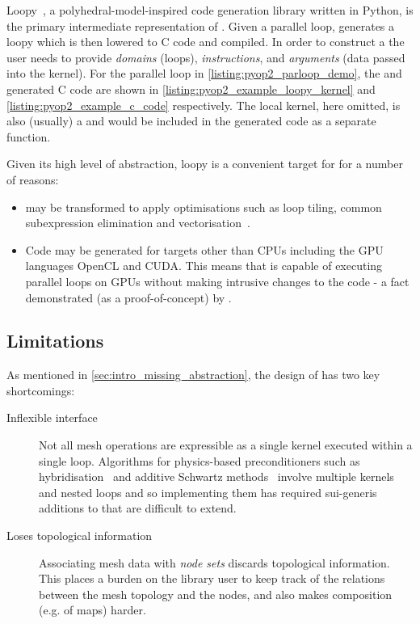 \documentclass[thesis]{subfiles}
\begin{document}
Loopy~\cite{klocknerLooPyTransformationbased2014}, a polyhedral-model-inspired code generation library written in Python, is the primary intermediate representation of .
Given a parallel loop,  generates a loopy  which is then lowered to C code and compiled.
In order to construct a  the user needs to provide \emph{domains} (loops), \emph{instructions}, and \emph{arguments} (data passed into the kernel).
For the parallel loop in \cref{listing:pyop2_parloop_demo}, the  and generated C code are shown in \cref{listing:pyop2_example_loopy_kernel} and \cref{listing:pyop2_example_c_code} respectively.
The local kernel, here omitted, is also (usually) a  and would be included in the generated code as a separate function.

Given its high level of abstraction, loopy is a convenient target for  for a number of reasons:

\begin{itemize}
  \item
     may be transformed to apply optimisations such as loop tiling, common subexpression elimination and vectorisation~\cite{sunStudyVectorizationMatrixfree2020}.
  \item
    Code may be generated for targets other than CPUs including the GPU languages OpenCL and CUDA.
    This means that  is capable of executing parallel loops on GPUs without making intrusive changes to the code - a fact demonstrated (as a proof-of-concept) by \cite{fenics2021-kulkarni}.
\end{itemize}

\subsection{Limitations}
\label{sec:pyop2_limitations}

As mentioned in \cref{sec:intro_missing_abstraction}, the design of  has two key shortcomings:

\begin{description}
  \item[Inflexible interface]
    Not all mesh operations are expressible as a single kernel executed within a single loop.
    Algorithms for physics-based preconditioners such as hybridisation~\cite{gibsonSlateExtendingFiredrake2020} and additive Schwartz methods~\cite{farrellPCPATCHSoftwareTopological2021} involve multiple kernels and nested loops and so implementing them has required sui-generis additions to  that are difficult to extend.

  \item[Loses topological information]
    Associating mesh data with \textit{node sets} discards topological information.
    This places a burden on the library user to keep track of the relations between the mesh topology and the nodes, and also makes composition (e.g. of maps) harder.
\end{description}
\end{document}
